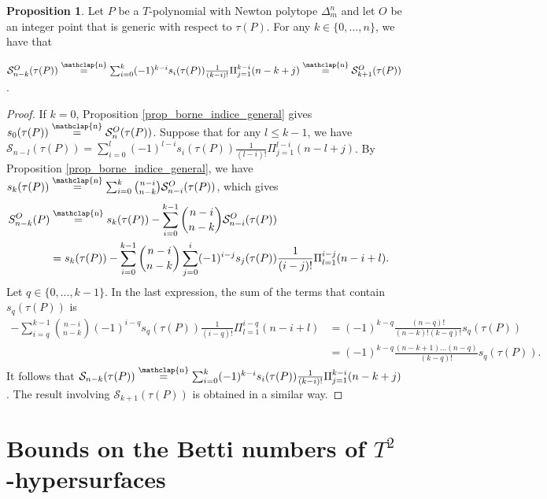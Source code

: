 \documentclass[12pt]{article}
\newcommand\customeq{\stackrel{\mathclap{\normalfont\scriptsize\mbox{n}}}{=}}
\theoremstyle{definition}
\newtheorem{prop}{Proposition}[section]
\begin{document}
\begin{prop}
    Let $P$ be a $T$-polynomial with Newton polytope $\Delta_m^n$ and let $O$ be an integer point that is generic with respect to $\tau(P)$. For any $k \in \{0,...,n \}$, we have that
    \begin{center}
    $\mathcal{S}_{n-k}^O(\tau(P)) \customeq \sum_{i = 0}^k (-1)^{k-i} s_i(\tau(P)) \frac{1}{(k-i)!}\Pi_{j=1}^{k-i}(n-k+j) \customeq \mathcal{S}_{k+1}^O(\tau(P))$.
    \end{center}
\end{prop}

\begin{proof}
    If $k = 0$, Proposition \ref{prop_borne_indice_general} gives $s_0(\tau(P)) \customeq \mathcal{S}_{n}^O(\tau(P))$. Suppose that for any $l \leq k-1$, we have $\mathcal{S}_{n-l}(\tau(P)) = \sum_{i = 0}^l (-1)^{l-i} s_i(\tau(P)) \frac{1}{(l-i)!}\Pi_{j=1}^{l-i}(n-l+j)$. By Proposition \ref{prop_borne_indice_general}, we have $s_k(\tau(P)) \customeq \sum_{i=0}^k { n-i \choose n-k } \mathcal{S}_{n-i}^O(\tau(P))$, which gives 
    \begin{align*}
        {S}_{n-k}^O(P) & \customeq  s_k(\tau(P)) - \sum_{i=0}^{k-1} { n-i \choose n-k } \mathcal{S}_{n-i}^O(\tau(P)) & \\ 
        & =  s_k(\tau(P)) - \sum_{i=0}^{k-1} { n-i \choose n-k } \sum_{j = 0}^i (-1)^{i-j} s_j(\tau(P)) \frac{1}{(i-j)!}\Pi_{l=1}^{i-j}(n-i+l).    
    \end{align*}
    Let $q \in \{0,...,k-1 \}$. 
    In the last expression, the sum of the terms that contain $s_q(\tau(P))$ is 
    \begin{align*}
        -\sum_{i=q}^{k-1} {n-i \choose n-k} (-1)^{i-q} s_q(\tau(P)) \frac{1}{(i-q)!}\Pi_{l=1}^{i-q}(n-i+l) & =  (-1)^{k-q} \frac{(n-q)!}{(n-k)!(k-q)!} s_q(\tau(P))\\
        &= (-1)^{k-q} \frac{(n-k+1)...(n-q)}{(k-q)!}s_q(\tau(P)).
    \end{align*}
    It follows that $\mathcal{S}_{n-k}(\tau(P)) \customeq \sum_{i = 0}^k (-1)^{k-i} s_i(\tau(P)) \frac{1}{(k-i)!}\Pi_{j=1}^{k-i}(n-k+j)$. The result involving $\mathcal{S}_{k+1}(\tau(P))$ is obtained in a similar way.
\end{proof}


\section{Bounds on the Betti numbers of $T^2$-hypersurfaces}
\end{document}
